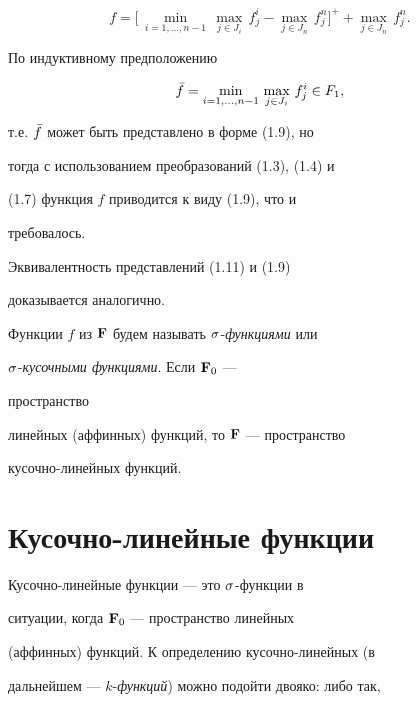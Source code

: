 \begin{pf}
$$


f = \bigl[\, \min_{i=1,\dotsc,n-1}\, \max_{j\in J_i}\, f_j^i


- \max_{j\in J_n}\, f_j^n \bigr]^+ + \max_{j\in J_n}\,f_j^n.


$$


По индуктивному предположению


$$


\Bar{f} = \min_{i=1,\dotsc,n-1}\, \max_{j\in J_i}\,


f_j^i \in F_1,


$$


т.е. $\Bar{f}$ может быть представлено в форме (1.9), но


тогда с использованием преобразований (1.3), (1.4) и


(1.7) функция $f$ приводится к виду (1.9), что и


требовалось.





Эквивалентность представлений (1.11) и (1.9)


доказывается аналогично.


\end{pf}





Функции $f$ из $\bold F$ будем называть $\sigma$-{\it функциями} или


$\sigma$-{\it кусочными функциями}. Если $\bold F_0$ --- \linebreak


пространство


линейных (аффинных) функций, то $\bold F$ --- пространство


кусочно-линейных функций.





\section{Кусочно-линейные функции}





Кусочно-линейные функции --- это $\sigma$-функции в


ситуации, когда $\bold F_0$ --- пространство линейных


(аффинных) функций. К определению кусочно-линейных (в


дальнейшем --- $k$-{\it функций}) можно подойти двояко: либо так,



